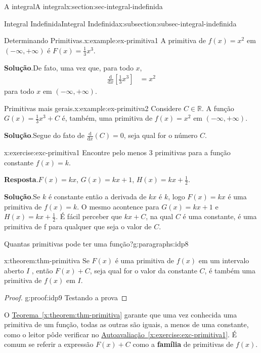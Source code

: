 \documentclass[oneside,10pt,]{article}
\newcommand{\blocktitlefont}{\relax}
\newcommand{\xreffont}{\relax}
\newcommand{\terminology}[1]{\textbf{#1}}
\numberwithin{equation}{section}
\newcommand{\dd}{\mathrm{d}}
\newcommand{\amp}{&}
\begin{document}
\begin{sectionptx}{A integral}{}{A integral}{}{}{x:section:sec-integral-indefinida}
\begin{subsectionptx}{Integral Indefinida}{}{Integral Indefinida}{}{}{x:subsection:subsec-integral-indefinida}
\begin{example}{Determinando Primitivas.}{x:example:ex-primitiva1}
A primitiva de \(f(x)=x^2\) em \((-\infty, +\infty)\) é \(F(x)=\frac{1}{3}x^3\).%
\par\smallskip%
\noindent\textbf{\blocktitlefont Solução}.\hypertarget{g:solution:idp4}{}\quad{}De fato, uma vez que, para todo \(x\),%
\begin{align*}
\frac{\dd}{\dd x}\left[\frac{1}{3}x^3\right]\amp = x^2
\end{align*}
para todo \(x\) em \((-\infty, +\infty)\).%
\end{example}
\begin{example}{Primitivas mais gerais.}{x:example:ex-primitiva2}%
Considere \(C \in \mathbb{R}\). A função \(G(x)= \frac{1}{3}x^3 + C\) é, também, uma primitiva de \(f(x)=x^2\) em \((-\infty, +\infty)\).%
\par\smallskip%
\noindent\textbf{\blocktitlefont Solução}.\hypertarget{g:solution:idp5}{}\quad{}Segue do fato de \(\frac{\dd}{\dd x}(C)=0\), seja qual for o número \(C\).%
\end{example}
\begin{inlineexercise}{}{x:exercise:exc-primitiva1}%
Encontre pelo menos 3 primitivas para a função constante \(f(x)=k\).%
\par\smallskip%
\noindent\textbf{\blocktitlefont Resposta}.\hypertarget{g:answer:idp6}{}\quad{}\(F(x)=kx\), \(G(x)=kx +1\), \(H(x)=kx+\frac{1}{2}\).%
\par\smallskip%
\noindent\textbf{\blocktitlefont Solução}.\hypertarget{g:solution:idp7}{}\quad{}Se \(k\) é constante então a derivada de \(kx\) é \(k\), logo \(F(x)=kx\) é uma primitiva de \(f(x)=k\). O mesmo acontence  para \(G(x)=kx +1\) e \(H(x)=kx+\frac{1}{2}\). É fácil perceber que \(kx+C\), na qual \(C\) é uma constante, é uma primitiva de f para qualquer que seja o valor de \(C\).%
\end{inlineexercise}%
\begin{paragraphs}{Quantas  primitivas pode ter uma função?}{g:paragraphs:idp8}%
\end{paragraphs}%
\begin{theorem}{}{}{x:theorem:thm-primitiva}%
Se  \(F(x)\) é uma primitiva de \(f(x)\) em um intervalo aberto \(I\) , então \(F(x) + C\), seja qual for o valor da constante \(C\), é também uma primitiva de \(f(x)\) em \(I\).%
\begin{proof}{}{g:proof:idp9}
Testando a prova%
\end{proof}
\end{theorem}
O  \hyperref[x:theorem:thm-primitiva]{Teorema~{\xreffont\ref{x:theorem:thm-primitiva}}} garante que uma vez conhecida uma primitiva de um função, todas as outras são iguais, a menos de uma constante, como o leitor pôde verificar no \hyperref[x:exercise:exc-primitiva1]{Autoavaliação~{\xreffont\ref{x:exercise:exc-primitiva1}}}. É comum se referir a expressão \(F(x)+C\) como a \terminology{família}  de primitivas de \(f(x)\).%

\end{subsectionptx}
\end{sectionptx}
\end{document}
